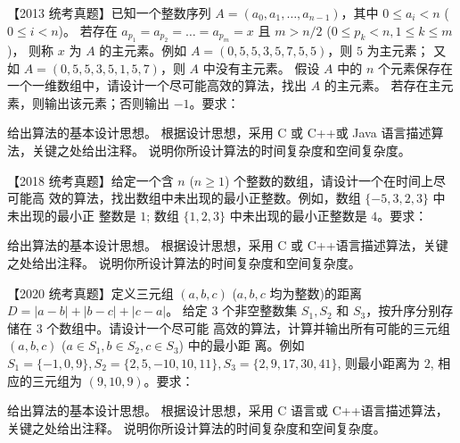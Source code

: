 \begin{qitems}
    \begin{bbox}
        \qitem 【2013 统考真题】已知一个整数序列 $A=(a_0, a_1, \dots, a_{n-1})$，其中 $0 \le a_i < n$ ($0 \le i < n$)。
        若存在 $a_{p_1} = a_{p_2} = \dots = a_{p_m} = x$ 且 $m > n/2$ ($0 \le p_k < n, 1 \le k \le m$)，
        则称 $x$ 为 $A$ 的主元素。例如 $A=(0, 5, 5, 3, 5, 7, 5, 5)$，则 $5$ 为主元素；
        又如 $A=(0, 5, 5, 3, 5, 1, 5, 7)$，则 $A$ 中没有主元素。
        假设 $A$ 中的 $n$ 个元素保存在一个一维数组中，请设计一个尽可能高效的算法，找出 $A$ 的主元素。
        若存在主元素，则输出该元素；否则输出 $-1$。要求：
        \begin{subqitems}
            \subqitem 给出算法的基本设计思想。
            \subqitem 根据设计思想，采用 C 或 C++或 Java 语言描述算法，关键之处给出注释。
            \subqitem 说明你所设计算法的时间复杂度和空间复杂度。
        \end{subqitems}
    \end{bbox}

    \begin{bbox}
        \qitem 【2018 统考真题】给定一个含 $n$ ($n\geqslant 1$) 个整数的数组，请设计一个在时间上尽可能高
        效的算法，找出数组中未出现的最小正整数。例如，数组 $\{-5,3,2,3\}$ 中未出现的最小正
        整数是 $1$; 数组 $\{1,2,3\}$ 中未出现的最小正整数是 $4$。要求：
        \begin{subqitems}
            \subqitem 给出算法的基本设计思想。
            \subqitem 根据设计思想，采用 C 或 C++语言描述算法，关键之处给出注释。
            \subqitem 说明你所设计算法的时间复杂度和空间复杂度。
        \end{subqitems}
    \end{bbox}

    \begin{bbox}
        \qitem 【2020 统考真题】定义三元组 $(a,b,c)$ ($a,b,c$ 均为整数)的距离 $D=|a-b|+|b-c|+|c-a|$。
        给定 $3$ 个非空整数集 $S_1, S_2$ 和 $S_3$，按升序分别存储在 $3$ 个数组中。请设计一个尽可能
        高效的算法，计算并输出所有可能的三元组 $(a,b,c)$ ($a\in S_1, b\in S_2, c\in S_3$) 中的最小距
        离。例如 $S_1=\{-1,0,9\}, S_2=\{2,5,-10,10,11\}, S_3=\{2,9,17,30,41\}$, 则最小距离为 $2$,
        相应的三元组为 $(9,10,9)$。要求：
        \begin{subqitems}
            \subqitem 给出算法的基本设计思想。
            \subqitem 根据设计思想，采用 C 语言或 C++语言描述算法，关键之处给出注释。
            \subqitem 说明你所设计算法的时间复杂度和空间复杂度。
        \end{subqitems}
    \end{bbox}

\end{qitems}
